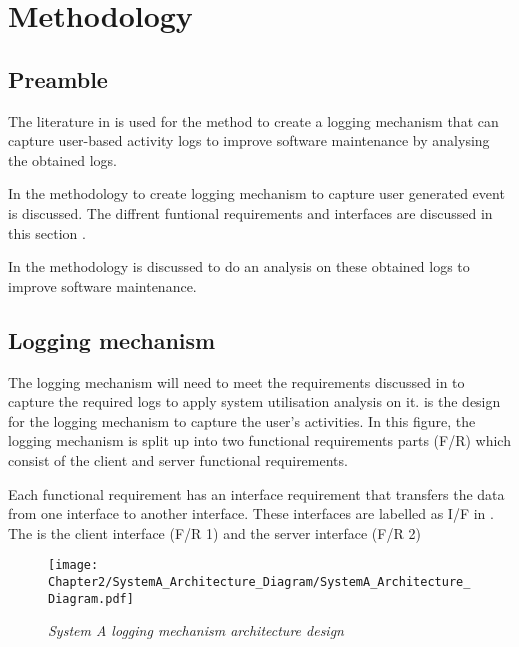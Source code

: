 \chapter{Methodology}
\label{chap:2}

\section{Preamble} The literature in  is used for the method to create a logging mechanism that can capture user-based activity logs to improve software maintenance by analysing the obtained logs.\par In  the methodology to create logging mechanism to capture user generated event is discussed. The diffrent funtional requirements and interfaces are discussed in this section \cite{Anish2015}.\par In  the methodology is discussed to do an analysis on these obtained logs to improve software maintenance.

\section{Logging mechanism}\label{Ch2:LoggingMechanism} The logging mechanism will need to meet the requirements discussed in  to capture the required logs to apply system utilisation analysis on it.  is the design for the logging mechanism to capture the user's activities. In this figure, the logging mechanism is split up into two functional requirements parts (F/R) which consist of the client and server functional requirements.\par Each functional requirement has an interface requirement that transfers the data from one interface to another interface. These interfaces are labelled as I/F in . The  is the client interface (F/R 1) and the server interface (F/R 2)

\begin{figure}[!htb] %
	\centering %
	\texttt{[image: Chapter2/SystemA\_Architecture\_Diagram/SystemA\_Architecture\_Diagram.pdf]}
	\caption[System A logging mechanism architecture design]
	{\textit{System A logging mechanism architecture design}}\label{fig:CH2_SystemA_Arch_Design}
\end{figure}

